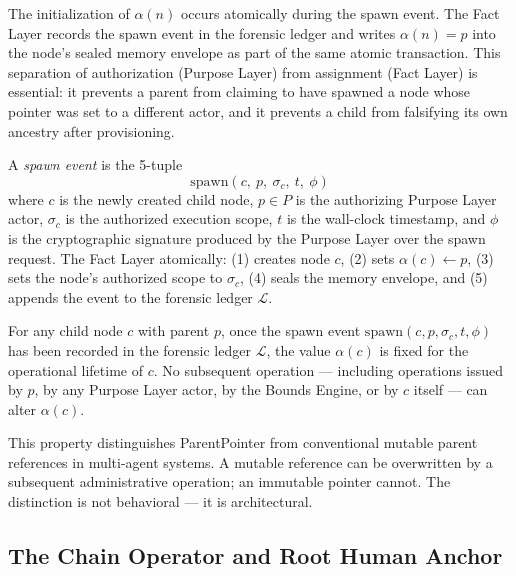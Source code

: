 The initialization of $\alpha(n)$ occurs atomically during the spawn event. The Fact Layer records the spawn event in the forensic ledger and writes $\alpha(n) = p$ into the node's sealed memory envelope as part of the same atomic transaction. This separation of authorization (Purpose Layer) from assignment (Fact Layer) is essential: it prevents a parent from claiming to have spawned a node whose pointer was set to a different actor, and it prevents a child from falsifying its own ancestry after provisioning.

\begin{dfn}
\label{dfn:spawn-event}
A \emph{spawn event} is the 5-tuple
\begin{equation}
\mathrm{spawn}(c,\ p,\ \sigma_c,\ t,\ \phi)
\label{eq:spawn-event}
\end{equation}
where $c$ is the newly created child node, $p \in P$ is the authorizing Purpose Layer actor, $\sigma_c$ is the authorized execution scope, $t$ is the wall-clock timestamp, and $\phi$ is the cryptographic signature produced by the Purpose Layer over the spawn request. The Fact Layer atomically: (1) creates node $c$, (2) sets $\alpha(c) \leftarrow p$, (3) sets the node's authorized scope to $\sigma_c$, (4) seals the memory envelope, and (5) appends the event to the forensic ledger $\mathcal{L}$.
\end{dfn}

\begin{prop}
\label{prop:parent-pointer-immutable}
For any child node $c$ with parent $p$, once the spawn event $\mathrm{spawn}(c, p, \sigma_c, t, \phi)$ has been recorded in the forensic ledger $\mathcal{L}$, the value $\alpha(c)$ is fixed for the operational lifetime of $c$. No subsequent operation --- including operations issued by $p$, by any Purpose Layer actor, by the Bounds Engine, or by $c$ itself --- can alter $\alpha(c)$.
\end{prop}

This property distinguishes ParentPointer from conventional mutable parent references in multi-agent systems. A mutable reference can be overwritten by a subsequent administrative operation; an immutable pointer cannot. The distinction is not behavioral --- it is architectural.

\subsection{The Chain Operator and Root Human Anchor}
\label{sec:chain-definition}

